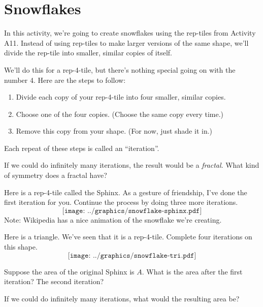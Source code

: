 \newpage
\section{Snowflakes}

In this activity, we're going to create snowflakes using the rep-tiles from Activity A11.  Instead of using rep-tiles to make larger versions of the same shape, we'll divide the rep-tile into smaller, similar copies of itself.

We'll do this for a rep-4-tile, but there's nothing special going on with the number 4.  Here are the steps to follow:
\begin{enumerate}
	\item Divide each copy of your rep-4-tile into four smaller, similar copies.
	\item Choose one of the four copies.  (Choose the same copy every time.)
	\item Remove this copy from your shape.  (For now, just shade it in.)
\end{enumerate}
  Each repeat of these steps is called an ``iteration''.
  
If we could do infinitely many iterations, the result would be a \textit{fractal}.  What kind of symmetry does a fractal have?


\begin{prob}
Here is a rep-4-tile called the Sphinx.  As a gesture of friendship, I've done the first iteration for you.  Continue the process by doing three more iterations.
\[
\texttt{[image: ../graphics/snowflake-sphinx.pdf]}
\]
Note: Wikipedia has a nice animation of the snowflake we're creating.
\end{prob}
\break

\begin{prob}
Here is a triangle.  We've seen that it is a rep-4-tile.  Complete four iterations on this shape.
\[
\texttt{[image: ../graphics/snowflake-tri.pdf]}
\]

\end{prob}

\begin{prob}  Suppose the area of the original Sphinx is $A$.  What is the area after the first iteration?  The second iteration?
\end{prob}

\begin{prob}
 If we could do infinitely many iterations, what would the resulting area be?
\end{prob}

